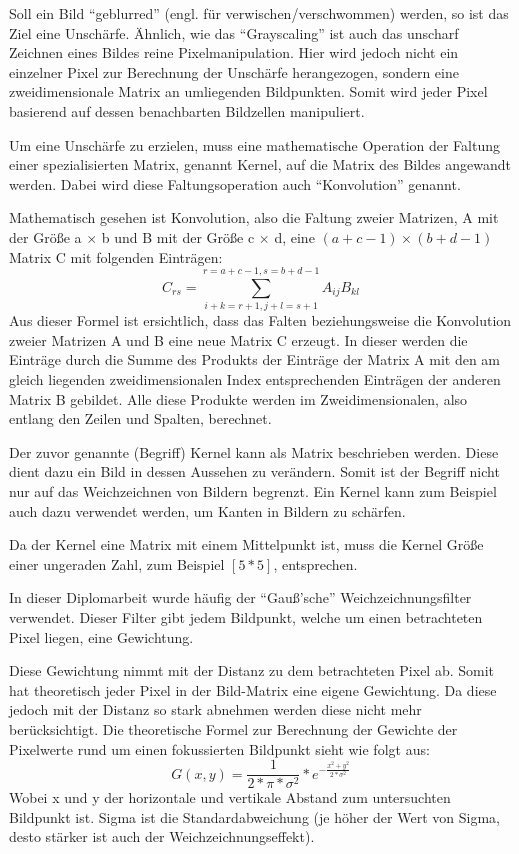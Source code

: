 Soll ein Bild ``geblurred'' (engl. für verwischen/verschwommen) werden, so ist das Ziel eine Unschärfe. Ähnlich, wie das ``Grayscaling'' ist auch das unscharf Zeichnen eines Bildes reine Pixelmanipulation. Hier wird jedoch nicht ein einzelner Pixel zur Berechnung der Unschärfe herangezogen, sondern eine zweidimensionale Matrix an umliegenden Bildpunkten. Somit wird jeder Pixel basierend auf dessen benachbarten Bildzellen manipuliert.

Um eine Unschärfe zu erzielen, muss eine mathematische Operation der Faltung einer spezialisierten Matrix, genannt Kernel, auf die Matrix des Bildes angewandt werden. Dabei wird diese Faltungsoperation auch ``Konvolution'' genannt.

Mathematisch gesehen ist Konvolution, also die Faltung zweier Matrizen, A mit der Größe a \(\times\) b und B mit der Größe c \(\times\) d, eine \((a + c -1) \times (b + d - 1)\) Matrix C mit folgenden Einträgen:
\[
    C_{ rs } = \sum_{i+k=r+1, j+l=s+1}^{r=a+c-1,s = b + d - 1} A_{ ij }B_{ kl }
\]
Aus dieser Formel ist ersichtlich, dass das Falten beziehungsweise die Konvolution zweier Matrizen A und B eine neue Matrix C erzeugt. In dieser werden die Einträge durch die Summe des Produkts der Einträge der Matrix A mit den am gleich liegenden zweidimensionalen Index entsprechenden Einträgen der anderen Matrix B gebildet. Alle diese Produkte werden im Zweidimensionalen, also entlang den Zeilen und Spalten, berechnet.

Der zuvor genannte (Begriff) Kernel kann als Matrix beschrieben werden. Diese dient dazu ein Bild in dessen Aussehen zu verändern. Somit ist der Begriff nicht nur auf das Weichzeichnen von Bildern begrenzt. Ein Kernel kann zum Beispiel auch dazu verwendet werden, um Kanten in Bildern zu schärfen.

Da der Kernel eine Matrix mit einem Mittelpunkt ist, muss die Kernel Größe einer ungeraden Zahl, zum Beispiel \([5*5]\), entsprechen.

In dieser Diplomarbeit wurde häufig der ``Gauß'sche'' Weichzeichnungsfilter verwendet. Dieser Filter gibt jedem Bildpunkt, welche um einen betrachteten Pixel liegen, eine Gewichtung.

Diese Gewichtung nimmt mit der Distanz zu dem betrachteten Pixel ab. Somit hat theoretisch jeder Pixel in der Bild-Matrix eine eigene Gewichtung. Da diese jedoch mit der Distanz so stark abnehmen werden diese nicht mehr berücksichtigt. Die theoretische Formel zur Berechnung der Gewichte der Pixelwerte rund um einen fokussierten Bildpunkt sieht wie folgt aus:
\[
    G(x,y)=\frac{ 1 }{ 2*\pi*\sigma^2 }*e^{ - \frac{ x^2 + y^2 }{ 2*\sigma^2 } }
\]
Wobei x und y der horizontale und vertikale Abstand zum untersuchten Bildpunkt ist. Sigma ist die Standardabweichung (je höher der Wert von Sigma, desto stärker ist auch der Weichzeichnungseffekt).

